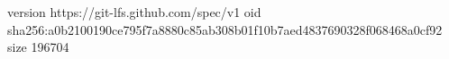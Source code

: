 version https://git-lfs.github.com/spec/v1
oid sha256:a0b2100190ce795f7a8880c85ab308b01f10b7aed4837690328f068468a0cf92
size 196704

